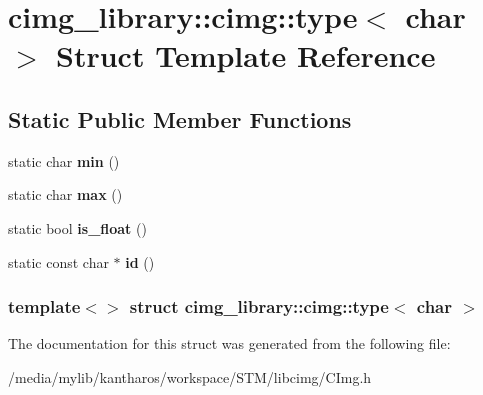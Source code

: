 \hypertarget{structcimg__library_1_1cimg_1_1type_3_01char_01_4}{
\section{cimg\_\-library::cimg::type$<$ char $>$ Struct Template Reference}
\label{structcimg__library_1_1cimg_1_1type_3_01char_01_4}
}
\subsection*{Static Public Member Functions}
\begin{DoxyCompactItemize}
\item 
\hypertarget{structcimg__library_1_1cimg_1_1type_3_01char_01_4_a8d9601354495d1e33f11da6d82770b20}{
static char {\bfseries min} ()}
\label{structcimg__library_1_1cimg_1_1type_3_01char_01_4_a8d9601354495d1e33f11da6d82770b20}

\item 
\hypertarget{structcimg__library_1_1cimg_1_1type_3_01char_01_4_a7e829821be9d4800f4121ad3b5867861}{
static char {\bfseries max} ()}
\label{structcimg__library_1_1cimg_1_1type_3_01char_01_4_a7e829821be9d4800f4121ad3b5867861}

\item 
\hypertarget{structcimg__library_1_1cimg_1_1type_3_01char_01_4_a23da7b377cce5a77cd93da163b3e2405}{
static bool {\bfseries is\_\-float} ()}
\label{structcimg__library_1_1cimg_1_1type_3_01char_01_4_a23da7b377cce5a77cd93da163b3e2405}

\item 
\hypertarget{structcimg__library_1_1cimg_1_1type_3_01char_01_4_a4d9fcfb55b16e13419fae45448389ae5}{
static const char $\ast$ {\bfseries id} ()}
\label{structcimg__library_1_1cimg_1_1type_3_01char_01_4_a4d9fcfb55b16e13419fae45448389ae5}

\end{DoxyCompactItemize}
\subsubsection*{template$<$$>$ struct cimg\_\-library::cimg::type$<$ char $>$}



The documentation for this struct was generated from the following file:\begin{DoxyCompactItemize}
\item 
/media/mylib/kantharos/workspace/STM/libcimg/CImg.h\end{DoxyCompactItemize}
